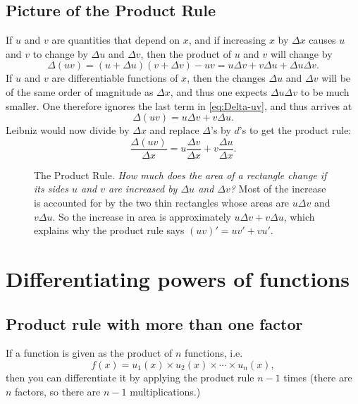 \subsection{Picture of the Product Rule}
\label{sec:picture-product-rule}
If $u$ and $v$ are quantities that depend on $x$, and if increasing $x$ by
$\Delta x$ causes $u$ and $v$ to change by $\Delta u$ and $\Delta v$, then the
product of $u$ and $v$ will change by 
\begin{equation}
  \label{eq:Delta-uv}
  \Delta(uv)
  =(u+\Delta u)(v+\Delta v) - uv
  = u\Delta v+v\Delta u + \Delta u \Delta v.
\end{equation}
If $u$ and $v$ are differentiable functions of $x$, then the changes $\Delta u$
and $\Delta v$ will be of the same order of magnitude as $\Delta x$, and thus
one expects $\Delta u\Delta v$ to be much smaller.  One therefore ignores the
last term in \eqref{eq:Delta-uv}, and thus arrives at
\[
\Delta(uv) =  u\Delta v+v\Delta u.
\]
Leibniz would now divide by $\Delta x$ and replace $\Delta$'s by $d$'s
to get the product rule:
\[
\frac{\Delta(uv)}{\Delta x}
=  u\frac{\Delta v}{\Delta x}+v\frac{\Delta u}{\Delta x}.
\]
\begin{figure}[h]\centering
  
  \caption{The Product Rule. \textit{How much does the area of a rectangle
  change if its sides $u$ and $v$ are increased by $\Delta u$ and
  $\Delta v$? } Most of the increase is accounted for by the two thin
  rectangles whose areas are $u\Delta v$ and $v\Delta u$.  So the increase
  in area is approximately $u\Delta v + v\Delta u$, which explains why the
  product rule says $(uv)' = uv'+ vu'$. }
\end{figure}

\section{Differentiating powers of functions}

\subsection{Product rule with more than one factor}
If a function is given as the product of $n$ functions, i.e.
\[
f(x) = u_1(x) \times u_2(x) \times \cdots \times  u_n(x),
\]
then you can differentiate it by applying the product rule $n-1$ times
(there are $n$ factors, so there are $n-1$ multiplications.)

